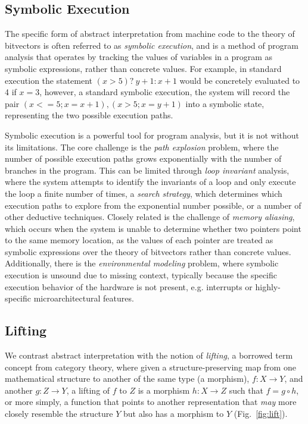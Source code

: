 \subsection{Symbolic Execution}

The specific form of abstract interpretation from machine code to the theory of bitvectors is often referred to as \emph{symbolic execution}, and is a method of program analysis that operates by tracking the values of variables in a program as symbolic expressions, rather than concrete values.
For example, in standard execution the statement $(x > 5) ?\ y + 1 : x + 1$ would be concretely evaluated to 4 if $x = 3$, however, a standard symbolic execution, the system will record the pair $(x<=5; x=x+1),(x>5;x=y+1)$ into a symbolic state, representing the two possible execution paths.

Symbolic execution is a powerful tool for program analysis, but it is not without its limitations.
The core challenge is the \emph{path explosion} problem, where the number of possible execution paths grows exponentially with the number of branches in the program.
This can be limited through \emph{loop invariant} analysis, where the system attempts to identify the invariants of a loop and only execute the loop a finite number of times, a \emph{search strategy}, which determines which execution paths to explore from the exponential number possible, or a number of other deductive techniques.
Closely related is the challenge of \emph{memory aliasing}, which occurs when the system is unable to determine whether two pointers point to the same memory location, as the values of each pointer are treated as symbolic expressions over the theory of bitvectors rather than concrete values.
Additionally, there is the \emph{environmental modeling} problem, where symbolic execution is unsound due to missing context, typically because the specific execution behavior of the hardware is not present, e.g. interrupts or highly-specific microarchitectural features.

\subsection{Lifting}
\label{ref:lifting-prelim}

We contrast abstract interpretation with the notion of \emph{lifting}, a borrowed term concept from category theory, where given a structure-preserving map from one mathematical structure to another of the same type (a morphism), $f: X \rightarrow Y$,  and another $g: Z \rightarrow Y$, a lifting of $f$ to $Z$ is a morphism $h: X \rightarrow Z$ such that $f = g \circ h$, or more simply, a function that points to another representation that \emph{may} more closely resemble the structure $Y$ but also has a morphism to $Y$ (Fig.~\ref{fig:lift}).

